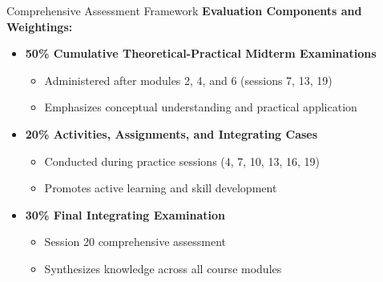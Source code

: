 \documentclass[10pt,aspectratio=169]{beamer}
\newcommand{\highlight}[1]{\textcolor{mLightBrown}{\textbf{#1}}}
\newcommand{\concept}[1]{\textcolor{mDarkTeal}{\textbf{#1}}}
\begin{document}
\begin{frame}{Comprehensive Assessment Framework}
    \concept{Evaluation Components and Weightings:}
    
    \vspace{0.3cm}
    
    \begin{itemize}
        \item \highlight{50\% Cumulative Theoretical-Practical Midterm Examinations}
        \begin{itemize}
            \item[\textbullet] Administered after modules 2, 4, and 6 (sessions 7, 13, 19)
            \item[\textbullet] Emphasizes conceptual understanding and practical application
        \end{itemize}
        
        \item \highlight{20\% Activities, Assignments, and Integrating Cases}
        \begin{itemize}
            \item[\textbullet] Conducted during practice sessions (4, 7, 10, 13, 16, 19)
            \item[\textbullet] Promotes active learning and skill development
        \end{itemize}
        
        \item \highlight{30\% Final Integrating Examination}
        \begin{itemize}
            \item[\textbullet] Session 20 comprehensive assessment
            \item[\textbullet] Synthesizes knowledge across all course modules
        \end{itemize}
    \end{itemize}
\end{frame}
\end{document}

